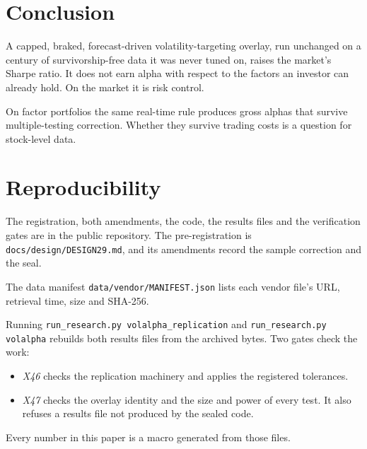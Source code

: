 \documentclass[11pt]{article}
\begin{document}
\section{Conclusion}

A capped, braked, forecast-driven volatility-targeting overlay, run
unchanged on a century of survivorship-free data it was never tuned on,
raises the market's Sharpe ratio. It does not earn alpha with respect to
the factors an investor can already hold. On the market it is risk control.

On factor portfolios the same real-time rule produces gross alphas that
survive multiple-testing correction. Whether they survive trading costs is a
question for stock-level data.

\appendix
\section{Reproducibility}

The registration, both amendments, the code, the results files and the
verification gates are in the public repository. The pre-registration is
\texttt{docs/design/DESIGN29.md}, and its amendments record the sample
correction and the seal.

The data manifest \texttt{data/vendor/MANIFEST.json} lists each vendor file's
URL, retrieval time, size and SHA-256.

Running \texttt{run\_research.py volalpha\_replication} and
\texttt{run\_research.py volalpha} rebuilds both results files from the
archived bytes. Two gates check the work:
\begin{itemize}
\item \emph{X46} checks the replication machinery and applies the
  registered tolerances.
\item \emph{X47} checks the overlay identity and the size and power of every
  test. It also refuses a results file not produced by the sealed code.
\end{itemize}
Every number in this paper is a macro generated from those files.



\end{document}
